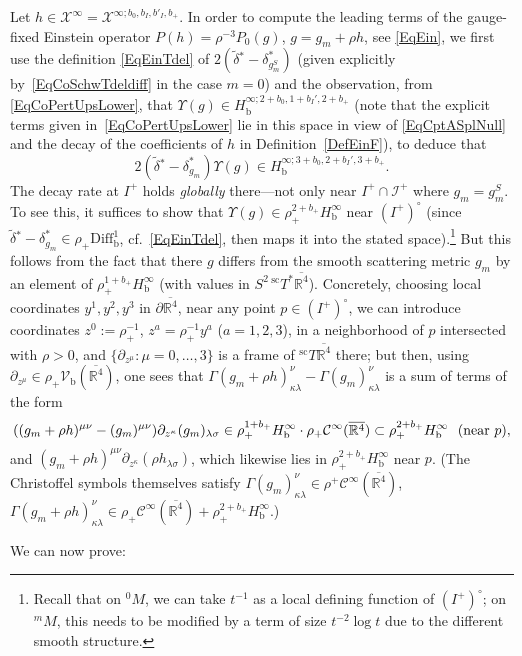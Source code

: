 \documentclass[reqno,11pt,letterpaper]{amsart}
\numberwithin{equation}{section}
\numberwithin{figure}{section}
\theoremstyle{definition}
\theoremstyle{remark}
\newcommand{\mc}{\mathcal}
\newcommand{\cC}{\mc C}
\newcommand{\cX}{\mc X}
\newcommand{\ms}{\mathscr}
\newcommand{\scri}{\ms I}
\newcommand{\R}{\mathbb{R}}
\newcommand{\Ups}{\Upsilon}
\newcommand{\ol}{\overline}
\newcommand{\pa}{\partial}
\newcommand{\tn}{\textnormal}
\newcommand{\wt}{\widetilde}
\newcommand{\bop}{{\mathrm{b}}}
\newcommand{\scl}{{\mathrm{sc}}}
\newcommand{\Diff}{\mathrm{Diff}}
\newcommand{\Vf}{\mathcal V}
\newcommand{\Vb}{\Vf_\bop}
\newcommand{\Diffb}{\Diff_\bop}
\newcommand{\Tsc}{{}^{\scl}T}
\newcommand{\CI}{\cC^\infty}
\newcommand{\Hb}{H_{\bop}}
\newcommand{\tdel}{\wt{\delta}{}}
\begin{document}
Let $h\in\cX^\infty=\cX^{\infty;b_0,b_I,b'_I,b_+}$. In order to compute the leading terms of the gauge-fixed Einstein operator $P(h)=\rho^{-3} P_0(g)$, $g=g_m+\rho h$, see \eqref{EqEin}, we first use the definition \eqref{EqEinTdel} of $2(\tdel^*-\delta_{g_m^S}^*)$ (given explicitly by~\eqref{EqCoSchwTdeldiff} in the case $m=0$) and the observation, from \eqref{EqCoPertUpsLower}, that $\Ups(g)\in\Hb^{\infty;2+b_0,1+b_I',2+b_+}$ (note that the explicit terms given in~\eqref{EqCoPertUpsLower} lie in this space in view of \eqref{EqCptASplNull} and the decay of the coefficients of $h$ in Definition~\ref{DefEinF}), to deduce that
\begin{equation}
\label{EqEinPTdelDelDiffUps}
  2(\tdel^*-\delta_{g_m}^*)\Ups(g) \in \Hb^{\infty;3+b_0,2+b_I',3+b_+}.
\end{equation}
The decay rate at $I^+$ holds \emph{globally} there---not only near $I^+\cap\scri^+$ where $g_m=g_m^S$. To see this, it suffices to show that $\Ups(g)\in\rho_+^{2+b_+}\Hb^\infty$ near $(I^+)^\circ$ (since $\tdel^*-\delta_{g_m}^*\in\rho_+\Diffb^1$, cf.\ \eqref{EqEinTdel}, then maps it into the stated space).\footnote{Recall that on ${}^0\!M$, we can take $t^{-1}$ as a local defining function of $(I^+)^\circ$; on ${}^m\!M$, this needs to be modified by a term of size $t^{-2}\log t$ due to the different smooth structure.} But this follows from the fact that there $g$ differs from the smooth scattering metric $g_m$ by an element of $\rho_+^{1+b_+}\Hb^\infty$ (with values in $S^2\,\Tsc^*\ol{\R^4}$). Concretely, choosing local coordinates $y^1,y^2,y^3$ in $\pa\ol{\R^4}$, near any point $p\in (I^+)^\circ$, we can introduce coordinates $z^0:=\rho_+^{-1}$, $z^a=\rho_+^{-1}y^a$ ($a=1,2,3$), in a neighborhood of $p$ intersected with $\rho>0$, and $\{\pa_{z^\mu}\colon \mu=0,\ldots,3\}$ is a frame of $\Tsc\ol{\R^4}$ there; but then, using $\pa_{z^\mu}\in\rho_+\Vb(\ol{\R^4})$, one sees that $\Gamma(g_m+\rho h)_{\kappa\lambda}^\nu-\Gamma(g_m)_{\kappa\lambda}^\nu$ is a sum of terms of the form
\[
    ((g_m+\rho h)^{\mu\nu}-(g_m)^{\mu\nu})\pa_{z^\kappa}(g_m)_{\lambda\sigma}\in \rho_+^{1+b_+}\Hb^\infty\cdot\rho_+\CI(\ol{\R^4})\subset\rho_+^{2+b_+}\Hb^\infty\ \ (\tn{near}\ p),
\]
and $(g_m+\rho h)^{\mu\nu}\pa_{z^\kappa}(\rho h_{\lambda\sigma})$, which likewise lies in $\rho_+^{2+b_+}\Hb^\infty$ near $p$. (The Christoffel symbols themselves satisfy $\Gamma(g_m)_{\kappa\lambda}^\nu\in\rho^+\CI(\ol{\R^4})$, $\Gamma(g_m+\rho h)_{\kappa\lambda}^\nu\in\rho_+\CI(\ol{\R^4})+\rho_+^{2+b_+}\Hb^\infty$.)

We can now prove:
\end{document}
